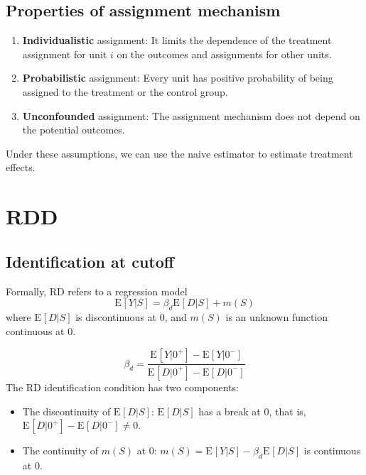 \documentclass[
]{ctexart}
\providecommand{\tightlist}{%
  \setlength{\itemsep}{0pt}\setlength{\parskip}{0pt}}
\newcommand{\0}{\textbf 0}
\newcommand{\1}{\textbf 1}
\providecommand{\e}{}\renewcommand{\e}[2][]{\text{E}_{#1}\br{#2}}
\def\br#1{\left[#1\right]}
\def\pr#1{\left(#1\right)}
\begin{document}
\hypertarget{properties-of-assignment-mechanism}{%
\subsection{Properties of assignment
mechanism}\label{properties-of-assignment-mechanism}}

\begin{enumerate}
\def\labelenumi{\arabic{enumi}.}
\tightlist
\item
  \textbf{Individualistic} assignment: It limits the dependence of the
  treatment assignment for unit \(i\) on the outcomes and assignments
  for other units.
\item
  \textbf{Probabilistic} assignment: Every unit has positive probability
  of being assigned to the treatment or the control group.
\item
  \textbf{Unconfounded} assignment: The assignment mechanism does not
  depend on the potential outcomes.
\end{enumerate}

Under these assumptions, we can use the naive estimator to estimate
treatment effects.

\hypertarget{rdd}{%
\section{RDD}\label{rdd}}

\hypertarget{identification-at-cutoff}{%
\subsection{Identification at cutoff}\label{identification-at-cutoff}}

Formally, RD refers to a regression model \[
\e{Y|S} = \beta_d\e{D|S}+m\pr{S}
\] \hspace{0pt} where \(\e{D|S}\) is discontinuous at \(0\), and
\(m\pr{S}\) is an unknown function continuous at \(0\).

\[
\beta_d = \frac{\e{Y|0^+}-\e{Y|0^-}}{\e{D|0^+}-\e{D|0^-}}
\] The RD identification condition has two components:

\begin{itemize}
\tightlist
\item
  The discontinuity of \(\e{D|S}\): \(\e{D|S}\) has a break at \(0\),
  that is, \(\e{D|0^+}-\e{D|0^-} \ne 0\).
\item
  The continuity of \(m\pr{S}\) at \(0\):
  \(m\pr{S} = \e{Y|S}-\beta_d\e{D|S}\) is continuous at \(0\).
\end{itemize}
\end{document}
